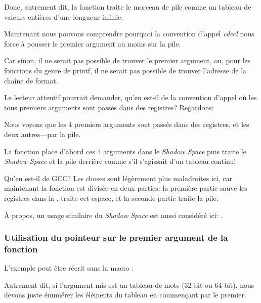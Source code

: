 Donc, autrement dit, la fonction traite le morceau de pile comme un tableau de valeurs
entières d'une longueur infinie.

Maintenant nous pouvons comprendre pourquoi la convention d'appel \emph{cdecl} nous
force à pousser le premier argument au moins sur la pile.

Car sinon, il ne serait pas possible de trouver le premier argument, ou, pour les
fonctions du genre de printf, il ne serait pas possible de trouver l'adresse de la
chaîne de format.

\label{variadic_arith_registers}

Le lecteur attentif pourrait demander, qu'en est-il de la convention d'appel où les
tous premiers arguments sont passés dans des registres?
Regardons:



Nous voyons que les 4 premiers arguments sont passés dans des registres, et les deux
autres---par la pile.

La fonction  place d'abord ces 4 arguments dans le \emph{Shadow Space}
puis traite le \emph{Shadow Space} et la pile derrière comme s'il s'agissait d'un tableau
continu!

Qu'en est-il de GCC? Les choses sont légèrement plus maladroites ici, car maintenant
la fonction est divisée en deux parties:
la première partie sauve les registres dans la , traite cet espace,
et la seconde partie traite la pile:



À propos, un usage similaire du \emph{Shadow Space} est aussi considéré ici: .

\subsubsection{Utilisation du pointeur sur le premier argument de la fonction}

L'exemple peut être récrit sans la macro :



Autrement dit, si l'argument mis est un tableau de mots (32-bit ou 64-bit), nous devons
juste énumérer les éléments du tableau en commençant par le premier.
